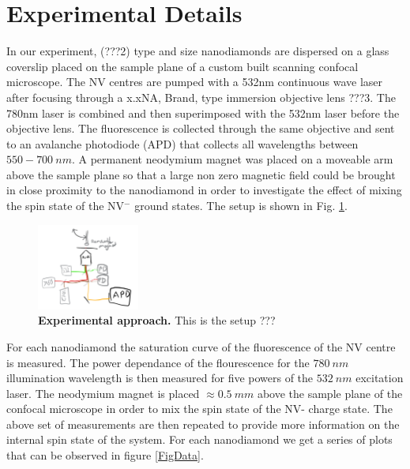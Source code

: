 \documentclass[preprint,prl,twocolumn]{revtex4}
\begin{document}
\section{Experimental Details}
In our experiment, (???2) type and size nanodiamonds are dispersed on a glass coverslip placed on the sample plane of a custom built scanning confocal microscope. The NV centres are pumped with a 532nm continuous wave laser after focusing through a x.xNA, Brand, type immersion objective lens ???3. The 780nm laser is combined and then superimposed with the 532nm laser before the objective lens. The fluorescence is collected through the same objective and sent to an avalanche photodiode (APD) that collects all wavelengths between $550-\SI{700}{nm}$. A permanent neodymium magnet was placed on a moveable arm above the sample plane so that a large non zero magnetic field could be brought in close proximity to the nanodiamond in order to investigate the effect of mixing the spin state of the NV$^-$ ground states. The setup is shown in Fig. \ref{FigSetup}.

\begin{figure}[t]
  \centering
  \includegraphics[width=0.3\textwidth]{Setup.png} 
 \caption{\textbf{Experimental approach.} This is the setup ???} \label{FigSetup}
\end{figure}

For each nanodiamond the saturation curve of the fluorescence of the NV centre is measured. The power dependance of the flourescence for the $\SI{780}{nm}$ illumination wavelength is then measured for five powers of the $\SI{532}{nm}$ excitation laser. The neodymium magnet is placed $\approx \SI{0.5}{mm}$ above the sample plane of the confocal microscope in order to mix the spin state of the NV- charge state. The above set of measurements are then repeated to provide more information on the internal spin state of the system. For each nanodiamond we get a series of plots that can be observed in figure \ref{FigData}.
\end{document}

